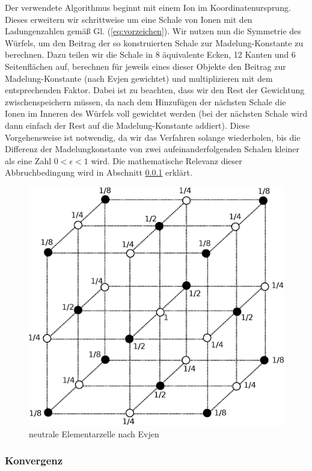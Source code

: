 \documentclass[10pt,a4paper]{article}
\begin{document}
Der verwendete Algorithmus beginnt mit einem Ion im Koordinatenursprung. Dieses
erweitern wir schrittweise um eine Schale von Ionen mit den Ladungenzahlen gemäß
Gl. (\ref{eq:vorzeichen}). Wir nutzen nun die Symmetrie des Würfels, um den Beitrag
der so konstruierten Schale zur Madelung-Konstante zu berechnen. Dazu teilen wir die
Schale in 8 äquivalente Ecken, 12 Kanten und 6 Seitenflächen auf, berechnen für
jeweils eines dieser Objekte den Beitrag zur Madelung-Konstante (nach Evjen gewichtet)
und multiplizieren mit dem entsprechenden Faktor. Dabei ist zu beachten, dass wir
den Rest der Gewichtung zwischenspeichern müssen, da nach dem Hinzufügen der nächsten
Schale die Ionen im Inneren des Würfels voll gewichtet werden (bei der nächsten Schale
wird dann einfach der Rest auf die Madelung-Konstante addiert). Diese Vorgehensweise ist notwendig, da wir das Verfahren solange wiederholen, bis die Differenz der Madelungkonstante
von zwei aufeinanderfolgenden Schalen kleiner als eine Zahl $0 < \epsilon < 1$ wird. Die
mathematische Relevanz dieser Abbruchbedingung wird in Abschnitt \ref{sssec:Konvergenz}
erklärt.

\begin{figure}[h]
	\centering
	\includegraphics[scale = 0.35]{./figures/wuerfel.eps}
	\caption{neutrale Elementarzelle nach Evjen}
	\label{skalierungsgrafik3d}
\end{figure}

\subsubsection{Konvergenz}
\label{sssec:Konvergenz}
\end{document}
